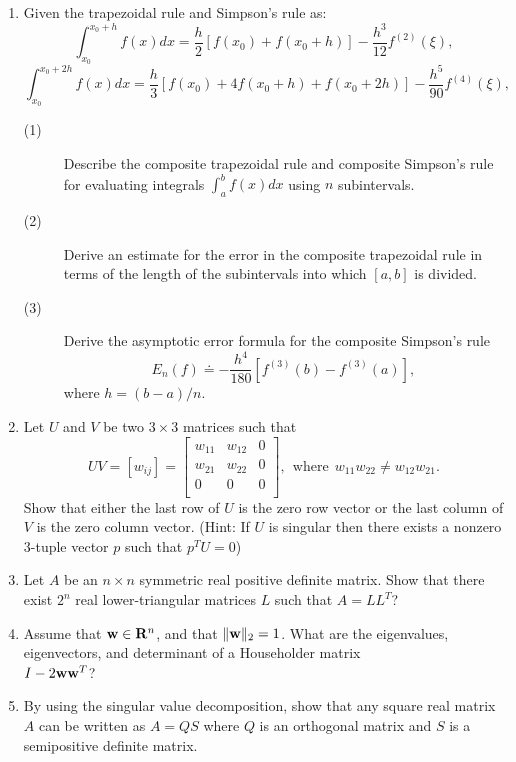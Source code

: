 \begin{large}
\begin{enumerate}
 \item
Given the trapezoidal rule and Simpson's rule as:
\[
\int_{x_0}^{x_0+h} f(x) dx = \frac{h}{2} [f(x_0) + f(x_0+h)] - \frac{h^3}{12
}
f^{(2)}(\xi) ,
\]
\[
\int_{x_0}^{x_0+2h} f(x) dx = \frac{h}{3} [f(x_0) + 4f(x_0+h)+f(x_0+2h)] -
\frac{h^5}{90} f^{(4)}(\xi) ,
\]
\begin{description}
\item[(1)]
Describe the composite trapezoidal rule and composite Simpson's rule for
evaluating integrals $\int_a^b f(x) dx$ using $n$ subintervals.
\item[(2)]
 Derive an estimate for the error in the composite trapezoidal rule in terms
of the length of the subintervals into which $[a,b]$ is divided.
\par
\item[(3)] Derive the asymptotic error formula for the composite
Simpson's rule
\[  E_n(f) \doteq -\frac{h^4}{180} [f^{(3)}(b)-f^{(3)}(a)], \] 
where $h = (b-a)/n$.
\par
\end{description}


 \item  Let $U$ and  $V$ be two $3 \times 3$ matrices such that
\[ UV  = [w_{ij}] =  \left[ \begin{array}{rrr}
            w_{11}    &w_{12}  &0     \\
            w_{21}    &w_{22}  &0     \\
            0         &0       &0     \\
         \end{array}    \right] ,  \ \ \mbox{where} \ \
 w_{11} w_{22} \neq  w_{12} w_{21} .            \]
Show that either the last row of $U$ is the zero row vector
or the last column of $V$ is the zero column vector.
(Hint: If $U$ is singular then there exists a nonzero 3-tuple vector
$p$ such that $p^T U = 0$)


\item  Let $A$ be an $n \times n$ symmetric real positive definite
matrix. Show that there exist $2^n$ real lower-triangular matrices $L$
such that $A = LL^T$?

  \item
Assume that ${\bf w} \in {\bf R}^n$, and that $ \| {\bf w} \|_2=1$.
What are the eigenvalues, eigenvectors, and determinant of a Householder
matrix \\ $I - 2{\bf ww}^T$? 



 \item
By using the singular value decomposition, show that any square real
matrix $A$ can be 
written as
$A=QS$ where $Q$ is an orthogonal matrix and $S$ is a semipositive
definite matrix.


 \end{enumerate}




\end{large}



